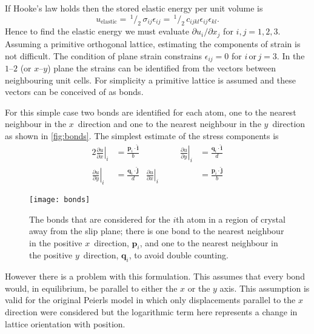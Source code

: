 If Hooke's law holds then the stored elastic energy per unit volume is
\begin{equation}
u_{\text{elastic}} =\, ^{1}\!/_{2}\, \sigma_{ij} \epsilon_{ij} =\, ^{1}\!/_{2}\, c_{ijkl} \epsilon_{ij} \epsilon_{kl}.
\end{equation}
Hence to find the elastic energy we must evaluate \({\partial u_i}/{\partial x_j}\) for $i, j = 1, 2, 3$.
Assuming a primitive orthogonal lattice, estimating the components of strain is not difficult. The  condition of plane strain constrains $\epsilon_{ij} = 0$ for $i\, \text{or}\, j=3$. In the $1$--$2$ (or $x$--$y$) plane the strains can be identified from the vectors between neighbouring unit cells. For simplicity a primitive lattice is assumed and these vectors can be conceived of as bonds.

For this simple case two bonds are identified for each atom, one to the nearest neighbour in the $x$~direction and one to the nearest neighbour in the $y$~direction as shown in \autoref{fig:bonds}. The simplest estimate of the stress components is
\begin{alignat}{2}\label{eqn:estimate_strains}
\left. \frac{\partial u}{\partial x}\right|_i &= \frac{\mathbf{p}_i \cdot \mathbf{\hat{i}}}{b} &\qquad\qquad
\left. \frac{\partial u}{\partial y}\right|_i &= \frac{\mathbf{q}_i \cdot \mathbf{\hat{i}}}{d} \nonumber\\
\left. \frac{\partial u}{\partial y}\right|_i &= \frac{\mathbf{q}_i \cdot \mathbf{\hat{j}}}{d} &
\left. \frac{\partial u}{\partial x}\right|_i &= \frac{\mathbf{p}_i \cdot \mathbf{\hat{j}}}{b}
\end{alignat}


\begin{figure}
\centering
\texttt{[image: bonds]}
\caption[Strained bonds in a dislocated crystal.]{The bonds that are considered for the $i$th atom in a region of crystal away from the slip plane; there is one bond to the nearest neighbour in the positive $x$~direction, $\mathbf{p}_i$, and one to the nearest neighbour in the positive $y$~direction, $\mathbf{q}_i$, to avoid double counting.\label{fig:bonds} }
\end{figure}





However there is a problem with this formulation. This assumes that every bond would, in equilibrium, be parallel to either the $x$ or the $y$ axis. This assumption is valid for the original Peierls model in which only displacements parallel to the $x$ direction were considered but the logarithmic term here represents a change in lattice orientation with position. 

